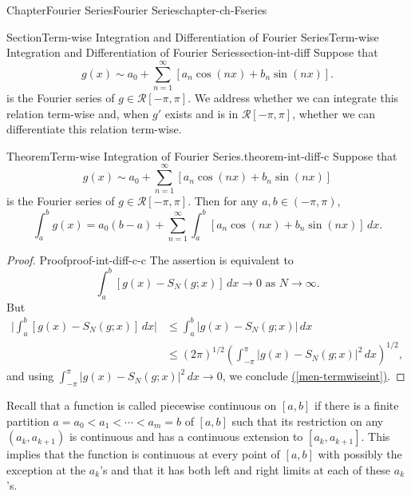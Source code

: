 \documentclass[oneside,10pt,]{book}
\newcommand{\xreffont}{\relax}
\numberwithin{equation}{section}
\newcommand{\cR}{\mathcal{R}}
\newcommand{\lt}{<}
\newcommand{\amp}{&}
\begin{document}
\begin{chapterptx}{Chapter}{Fourier Series}{}{Fourier Series}{}{}{chapter-ch-Fseries}
%
\begin{sectionptx}{Section}{Term-wise Integration and Differentiation of Fourier Series}{}{Term-wise Integration and Differentiation of Fourier Series}{}{}{section-int-diff}
Suppose that%
\begin{equation*}
g(x)\sim a_0 +\sum_{n=1}^{\infty}\left[ a_n \cos (n x) + b_n \sin (nx) \right].
\end{equation*}
is the Fourier series of \(g\in \cR[-\pi, \pi]\). We address whether we can integrate this relation term-wise and, when \(g'\) exists and is in \(\cR[-\pi, \pi]\), whether we can differentiate this relation term-wise.%
\begin{theorem}{Theorem}{Term-wise Integration  of Fourier Series.}{}{theorem-int-diff-c}%
Suppose that%
\begin{equation*}
g(x)\sim a_0 +\sum_{n=1}^{\infty}\left[ a_n \cos (n x) + b_n \sin (nx) \right]
\end{equation*}
is the Fourier series of \(g\in \cR[-\pi, \pi]\). Then for any \(a, b \in (-\pi, \pi)\),%
\begin{equation*}
\int_{a}^{b} g(x) = a_{0}(b-a) + \sum_{n=1}^{\infty}\int_{a}^{b}  \left[ a_n \cos (n x) + b_n \sin (nx) \right]\, dx.
\end{equation*}
\end{theorem}
\begin{proof}{Proof}{}{proof-int-diff-c-c}
The assertion is equivalent	 to%
\begin{equation}
\int_{a}^{b} \left[ g(x)-S_{N}(g; x)\right]\, dx \to 0 \text{ as $N\to \infty$.}\label{men-termwiseint}
\end{equation}
But%
\begin{align*}
\vert \int_{a}^{b} \left[ g(x)-S_{N}(g; x)\right]\, dx\vert 
\amp \le \int_{a}^{b} \vert g(x)-S_{N}(g; x)\vert \, dx\\
\amp \le \left(2\pi\right)^{1/2}\left( \int_{-\pi}^{\pi} \vert g(x)-S_{N}(g; x)\vert^{2} \, dx\right)^{1/2},
\end{align*}
and using \(\int_{-\pi}^{\pi} \vert g(x)-S_{N}(g; x)\vert^{2} \, dx\to 0\), we conclude \hyperref[men-termwiseint]{({\xreffont\ref{men-termwiseint}})}.%
\end{proof}
Recall that a function is called piecewise continuous on \([a, b]\) if there is a finite partition \(a=a_{0}\lt a_{1}\lt \cdots \lt a_{m}=b\) of \([a, b]\) such that its restriction on any \((a_{k}, a_{k+1})\) is continuous and has a continuous extension to \([a_{k}, a_{k+1}]\). This implies that the function is continuous at every point of \([a, b]\) with possibly the exception at the \(a_{k}\)'s and that it has both left and right limits at each of these \(a_{k}\)'s.%

\end{sectionptx}
\end{chapterptx}
\end{document}
